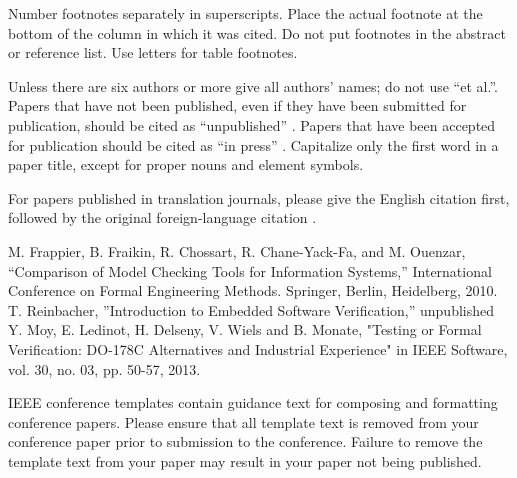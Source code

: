 \documentclass[conference]{IEEEtran}
\begin{document}
Number footnotes separately in superscripts. Place the actual footnote at 
the bottom of the column in which it was cited. Do not put footnotes in the 
abstract or reference list. Use letters for table footnotes.

Unless there are six authors or more give all authors' names; do not use 
``et al.''. Papers that have not been published, even if they have been 
submitted for publication, should be cited as ``unpublished'' \cite{b4}. Papers 
that have been accepted for publication should be cited as ``in press'' \cite{b5}. 
Capitalize only the first word in a paper title, except for proper nouns and 
element symbols.

For papers published in translation journals, please give the English 
citation first, followed by the original foreign-language citation \cite{b6}.

\begin{thebibliography}{00}
 M. Frappier, B. Fraikin, R. Chossart, R. Chane-Yack-Fa, and M. Ouenzar, ``Comparison of Model Checking Tools for Information Systems,'' International Conference on Formal Engineering Methods. Springer, Berlin, Heidelberg, 2010.
 T. Reinbacher, ''Introduction to Embedded Software Verification,'' unpublished
 Y. Moy, E. Ledinot, H. Delseny, V. Wiels and B. Monate, "Testing or Formal Verification: DO-178C Alternatives and Industrial Experience" in IEEE Software, vol. 30, no. 03, pp. 50-57, 2013.
\end{thebibliography}
\vspace{12pt}
\color{red}
IEEE conference templates contain guidance text for composing and formatting conference papers. Please ensure that all template text is removed from your conference paper prior to submission to the conference. Failure to remove the template text from your paper may result in your paper not being published.
\end{document}
